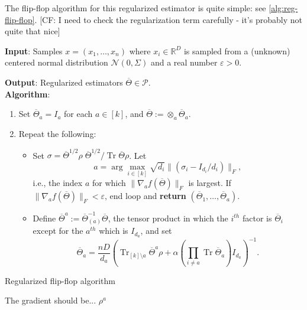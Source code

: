 \documentclass[aos]{imsart}
\theoremstyle{definition}
\DeclareMathOperator{\tr}{Tr}
\DeclarePairedDelimiter{\norm}{\lVert}{\rVert}
\newcommand{\R}{{\mathbb{R}}}
\newcommand{\otheta}{\overline{\Theta}}
\newcommand{\ot}{\otimes}
\newcommand{\eps}{\varepsilon}
\newcommand{\cN}{\mathcal{N}}
\newcommand{\SPD}{\mathcal{P}}
\newcommand{\samp}{x}
\newcommand{\CF}[1]{{\color{purple}[CF: #1]}}
\begin{document}
The flip-flop algorithm for this regularized estimator is quite simple: see \cref{alg:reg-flip-flop}. \CF{I need to check the regularization term carefully - it's probably not quite that nice} 


\begin{Algorithm}
\textbf{Input}: Samples $\samp = (\samp_1, \ldots, \samp_n)$ where $\samp_i \in \R^D$ is sampled from a (unknown) centered normal distribution $\cN(0, \Sigma)$ and a real number $\eps > 0$.  

\textbf{Output}: Regularized estimators $\otheta \in \SPD$.\\[.1ex]

\textbf{Algorithm}:
\begin{enumerate}
\item\label{it:flip-flop step 1} Set $\otheta_a = I_a$ for each $a \in [k]$, and $\otheta:= \otimes_a \otheta_a$.
\item\label{it:flip-flop step 2} Repeat the following:
\begin{itemize}
\item Set $\sigma = \otheta^{1/2} \rho \; \otheta^{1/2}/ \tr \otheta \rho$. Let $$a = \arg\max_{i \in [k]} \sqrt{d_i}\| (\sigma_i - I_{d_i}/d_i)\|_F,$$ 
i.e., the index $a$ for which $\|\nabla_a f(\otheta)\|_F$ is largest. If $\|\nabla_a f(\otheta)\|_F < \eps$, end loop and \textbf{return} $(\otheta_1, \dots, \otheta_a)$.  
\item Define $\otheta^a:= \otheta_{(a)}^{-1} \otheta$, the tensor product in which the $i^{th}$ factor is $\otheta_i$ except for the $a^{th}$ which is $I_{d_a}$, and set 
$$\otheta_a = \frac{n D}{d_a}\left(\tr_{[k] \setminus a} \otheta^a \rho + \alpha \left(\prod_{i \neq a} \tr \otheta_a\right) I_{d_a} \right)^{-1}.$$
\end{itemize}
\end{enumerate}
\caption{Regularized flip-flop algorithm}\label{alg:reg-flip-flop}
\end{Algorithm}
The gradient should be... $\rho^{a} $ 
\end{document}
